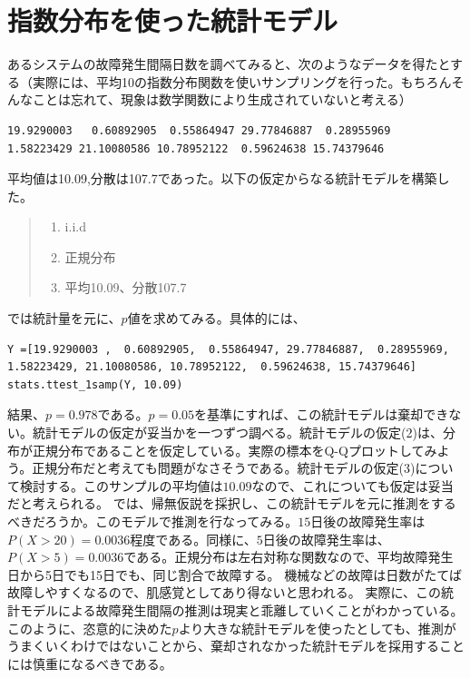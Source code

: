 
\chapter{指数分布を使った統計モデル}
あるシステムの故障発生間隔日数を調べてみると、次のようなデータを得たとする（実際には、平均10の指数分布関数を使いサンプリングを行った。もちろんそんなことは忘れて、現象は数学関数により生成されていないと考える）
\begin{lstlisting}
19.9290003   0.60892905  0.55864947 29.77846887  0.28955969  1.58223429 21.10080586 10.78952122  0.59624638 15.74379646
\end{lstlisting}


平均値は10.09,分散は107.7であった。以下の仮定からなる統計モデルを構築した。
\begin{quote}
    \begin{enumerate}[(1)]
\item i.i.d
\item 正規分布
\item 平均10.09、分散107.7
\end{enumerate}
\end{quote}
では統計量を元に、$p$値を求めてみる。具体的には、

\begin{lstlisting}
Y =[19.9290003 ,  0.60892905,  0.55864947, 29.77846887,  0.28955969,  1.58223429, 21.10080586, 10.78952122,  0.59624638, 15.74379646]
stats.ttest_1samp(Y, 10.09)
\end{lstlisting}

結果、$p=0.978$である。$p=0.05$を基準にすれば、この統計モデルは棄却できない。統計モデルの仮定が妥当かを一つずつ調べる。統計モデルの仮定(2)は、分布が正規分布であることを仮定している。実際の標本をQ-Qプロットしてみよう。正規分布だと考えても問題がなさそうである。統計モデルの仮定(3)について検討する。このサンプルの平均値は$10.09$なので、これについても仮定は妥当だと考えられる。
では、帰無仮説を採択し、この統計モデルを元に推測をするべきだろうか。このモデルで推測を行なってみる。$15$日後の故障発生率は$P(X>20)=0.0036$程度である。同様に、$5$日後の故障発生率は、$P(X>5)=0.0036$である。正規分布は左右対称な関数なので、平均故障発生日から5日でも15日でも、同じ割合で故障する。 
機械などの故障は日数がたてば故障しやすくなるので、肌感覚としてあり得ないと思われる。
実際に、この統計モデルによる故障発生間隔の推測は現実と乖離していくことがわかっている。
このように、恣意的に決めた$p$より大きな統計モデルを使ったとしても、推測がうまくいくわけではないことから、棄却されなかった統計モデルを採用することには慎重になるべきである。

